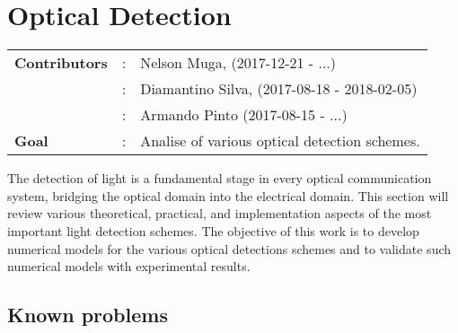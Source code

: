 

\clearpage
\section{Optical Detection}

\begin{tcolorbox}	
\begin{tabular}{p{2.75cm} p{0.2cm} p{10.5cm}}
\textbf{Contributors}  &:& Nelson Muga, (2017-12-21 - ...)\\
                       &:& Diamantino Silva, (2017-08-18 - 2018-02-05)\\
                       &:& Armando Pinto (2017-08-15 - ...)\\
\textbf{Goal}          &:& Analise of various optical detection schemes.\\
\end{tabular}
\end{tcolorbox}
%
\vspace{2em}
%
The detection of light is a fundamental stage in every optical communication system, bridging the optical domain into the electrical domain.
This section will review various theoretical, practical, and implementation aspects of the most important light detection schemes.
The objective of this work is to develop numerical models for the various optical detections schemes and to validate such numerical models with experimental results.\\
%
%





%
%
\subsection{Known problems}
%

